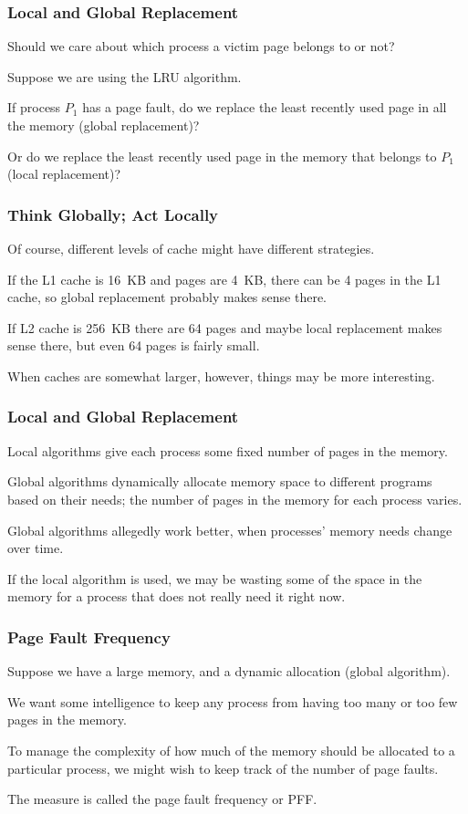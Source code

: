 \begin{frame}
\frametitle{Local and Global Replacement}

Should we care about which process a victim page belongs to or not? 

Suppose we are using the LRU algorithm. 

If process $P_{1}$ has a page fault, do we replace the least recently used page in all the memory (global replacement)?

Or do we replace the least recently used page in the memory that belongs to $P_{1}$ (local replacement)?


\end{frame}

\begin{frame}
\frametitle{Think Globally; Act Locally}

Of course, different levels of cache might have different strategies. 

If the L1 cache is 16~KB and pages are 4~KB, there can be 4 pages in the L1 cache, so global replacement probably makes sense there. 

If L2 cache is 256~KB there are 64 pages and maybe local replacement makes sense there, but even 64 pages is fairly small.

When caches are somewhat larger, however, things may be more interesting.

\end{frame}


\begin{frame}
\frametitle{Local and Global Replacement}

Local algorithms give each process some fixed number of pages in the memory.

Global algorithms dynamically allocate memory space to different programs based on their needs; the number of pages in the memory for each process varies.

Global algorithms allegedly work better, when processes' memory needs change over time.

If the local algorithm is used, we may be wasting some of the space in the memory for a process that does not really need it right now.

\end{frame}

\begin{frame}
\frametitle{Page Fault Frequency}

Suppose we have a large memory, and a dynamic allocation (global algorithm).

We want some intelligence to keep any process from having too many or too few pages in the memory.

To manage the complexity of how much of the memory should be allocated to a particular process, we might wish to keep track of the number of page faults.

The measure is called the \alert{page fault frequency} or PFF. 


\end{frame}

